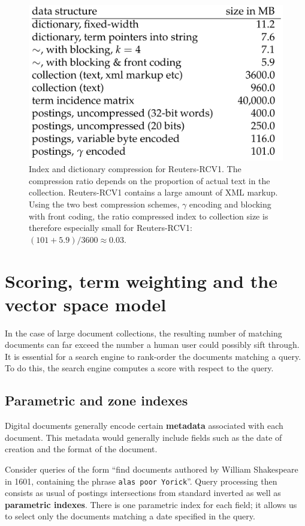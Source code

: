\documentclass[letterpaper,11pt]{article}
\newcommand{\code}[1]{\texttt{#1}}
\begin{document}
\begin{figure}[H]
    \centering
    \includegraphics[scale=0.60]{sect5/table_5_6.png}
    \caption{Index and dictionary compression for Reuters-RCV1. The compression ratio depends on the proportion of actual text in the collection. Reuters-RCV1 contains a large amount of XML markup. Using the two best compression schemes, $\gamma$ encoding and blocking with front coding, the ratio compressed index to collection size is therefore especially small for Reuters-RCV1: $(101 + 5.9)/3600\approx0.03$.}
\end{figure}

\section{Scoring, term weighting and the vector space model}
In the case of large document collections, the resulting number of matching documents can far exceed the number a human user could possibly sift through. It is essential for a search engine to rank-order the documents matching a query. To do this, the search engine computes a score with respect to the query.

\subsection{Parametric and zone indexes}
Digital documents generally encode certain \textbf{metadata} associated with each document. This metadata would generally include fields such as the date of creation and the format of the document.

Consider queries of the form “find documents authored by William Shakespeare in 1601, containing the phrase \code{alas poor Yorick}”. Query processing then consists as usual of postings intersections from standard inverted as well as\textbf{ parametric indexes}. There is one parametric index for each field; it allows us to select only the documents matching a date specified in the query.
\end{document}
